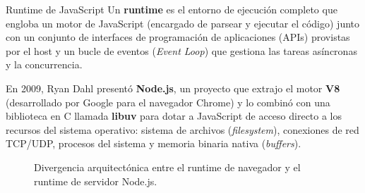 \begin{definicion}{Runtime de JavaScript}
Un \textbf{runtime} es el entorno de ejecución completo que engloba un motor de JavaScript (encargado de parsear y ejecutar el código) junto con un conjunto de interfaces de programación de aplicaciones (APIs) provistas por el host y un bucle de eventos (\emph{Event Loop}) que gestiona las tareas asíncronas y la concurrencia.
\end{definicion}

En 2009, Ryan Dahl presentó \textbf{Node.js}, un proyecto que extrajo el motor \textbf{V8} (desarrollado por Google para el navegador Chrome) y lo combinó con una biblioteca en C llamada \textbf{libuv} para dotar a JavaScript de acceso directo a los recursos del sistema operativo: sistema de archivos (\emph{filesystem}), conexiones de red TCP/UDP, procesos del sistema y memoria binaria nativa (\emph{buffers}).

\begin{figure}[htbp]
\centering
{}
\caption{Divergencia arquitectónica entre el runtime de navegador y el runtime de servidor Node.js.}
\label{fig:runtimes-comparison}
\end{figure}

